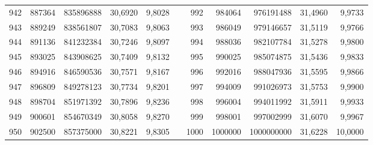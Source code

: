 \begin{longtable}{rrrrrrrrrrr}
942&887364&835896888&30,6920&9,8028&&992&984064&976191488&31,4960&9,9733\\
943&889249&838561807&30,7083&9,8063&&993&986049&979146657&31,5119&9,9766\\
944&891136&841232384&30,7246&9,8097&&994&988036&982107784&31,5278&9,9800\\
945&893025&843908625&30,7409&9,8132&&995&990025&985074875&31,5436&9,9833\\
946&894916&846590536&30,7571&9,8167&&996&992016&988047936&31,5595&9,9866\\
947&896809&849278123&30,7734&9,8201&&997&994009&991026973&31,5753&9,9900\\
948&898704&851971392&30,7896&9,8236&&998&996004&994011992&31,5911&9,9933\\
949&900601&854670349&30,8058&9,8270&&999&998001&997002999&31,6070&9,9967\\
950&902500&857375000&30,8221&9,8305&&1000&1000000&1000000000&31,6228&10,0000\\
\end{longtable}
